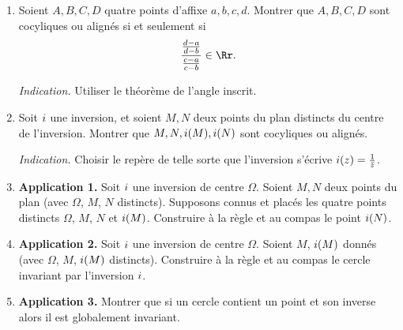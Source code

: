 \documentclass[11pt,class=report,crop=false]{standalone}
\begin{document}
\begin{exercicecours}
\label{exo:inversion_cocyclicite}
\sauteligne
\begin{enumerate}
  \item Soient $A, B, C, D$ quatre points d'affixe $a,b,c,d$.
Montrer que $A, B, C, D$ sont cocyliques ou alignés si
et seulement si  
$$\frac{\frac{d-a}{d-b}}{\frac{c-a}{c-b}} \in \Rr.$$

\emph{Indication.} 
Utiliser le théorème de l'angle inscrit.

  \item Soit $i$ une inversion, et soient $M,N$ deux points du plan distincts du centre de l'inversion.
  Montrer que $M, N, i(M), i(N)$ sont cocyliques ou alignés.
  
\emph{Indication.} Choisir le repère de telle sorte que l'inversion s'écrive $i(z)=  \frac{1}{\bar z}$.

  \item \textbf{Application 1.} Soit $i$ une inversion de centre $\Omega$. Soient $M, N$ deux points du plan
  (avec $\Omega$, $M$, $N$ distincts).
  Supposons connus et placés les quatre points distincts $\Omega$, $M$, $N$ et $i(M)$. Construire à la règle et au compas le point $i(N)$.
  
  \item \textbf{Application 2.} Soit $i$ une inversion de centre $\Omega$. Soient $M$, $i(M)$ donnés
    (avec $\Omega$, $M$, $i(M)$ distincts). 
    Construire à la règle et au compas le cercle invariant par l'inversion $i$.
    
  \item \textbf{Application 3.} Montrer que si un cercle contient un point et son inverse alors il est globalement invariant.
\end{enumerate}
\end{exercicecours}
\end{document}
